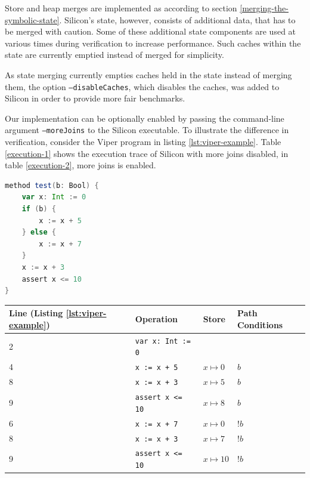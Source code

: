\documentclass[11pt]{article}
\begin{document}
    Store and heap merges are implemented as according to section \ref{merging-the-symbolic-state}.
    Silicon's state, however, consists of additional data, that has to be merged with caution.
    Some of these additional state components are used at various times during verification
    to increase performance.
    Such caches within the state are currently emptied instead of merged for simplicity.

    As state merging currently empties caches held in the state
    instead of merging them, the option
    \texttt{--disableCaches}, which disables the caches,
    was added to Silicon in order to provide more fair benchmarks.

    Our implementation can be optionally enabled by passing the command-line
    argument \texttt{--moreJoins} to the Silicon executable. To illustrate the difference
    in verification, consider the Viper program in listing \ref{lst:viper-example}.
    Table \ref{execution-1} shows the execution trace of Silicon with more joins disabled,
    in table \ref{execution-2}, more joins is enabled.

    \begin{lstlisting}[language=Scala, caption={An example Viper program.}, label={lst:viper-example}]
method test(b: Bool) {
    var x: Int := 0
    if (b) {
        x := x + 5
    } else {
        x := x + 7
    }
    x := x + 3
    assert x <= 10
}       
    \end{lstlisting}

    \begin{center}
        \begin{tabular}{ l|l|l|l }
            Line (Listing \ref{lst:viper-example}) & Operation & Store & Path Conditions \\
            \hline
            2 & \texttt{var x: Int := 0} & & \\
            4 & \texttt{x := x + 5} & $x \mapsto 0$ & $b$ \\
            8 & \texttt{x := x + 3} & $x \mapsto 5$ & $b$ \\
            9 & \texttt{assert x <= 10} & $x \mapsto 8$ & $b$ \\
            6 & \texttt{x := x + 7} & $x \mapsto 0$ & $!b$ \\
            8 & \texttt{x := x + 3} & $x \mapsto 7$ & $!b$ \\
            9 & \texttt{assert x <= 10} & $x \mapsto 10$ & $!b$ \\
        \end{tabular}
        \label{execution-1}
    \end{center}
\end{document}
